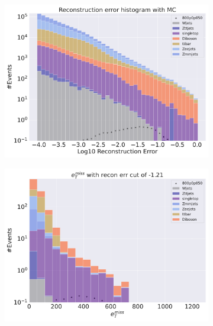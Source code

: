 \begin{figure}[H]
    \centering
    \begin{subfigure}{.40\textwidth}
        \includegraphics[width=\textwidth]{Figures/AE_testing/small/2lep/b_data_recon_big_rm3_feats_sig_800p0p050_.pdf}
        \caption{ }
        \label{fig:AE_2lep_small_800_2}
    \end{subfigure}
    \hfill
    \begin{subfigure}{.40\textwidth}
        \includegraphics[width=\textwidth]{Figures/AE_testing/small/2lep/b_data_recon_big_rm3_feats_sig_800p0p050_recon_errcut_-1.21.pdf}
        \caption{}
        \label{fig:AE_2lep_small_etmiss_800_2}
    \end{subfigure}

\end{figure}
